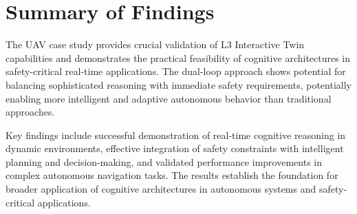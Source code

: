 \section{Summary of Findings}

The UAV case study provides crucial validation of L3 Interactive Twin capabilities and demonstrates the practical feasibility of cognitive architectures in safety-critical real-time applications. The dual-loop approach shows potential for balancing sophisticated reasoning with immediate safety requirements, potentially enabling more intelligent and adaptive autonomous behavior than traditional approaches.

Key findings include successful demonstration of real-time cognitive reasoning in dynamic environments, effective integration of safety constraints with intelligent planning and decision-making, and validated performance improvements in complex autonomous navigation tasks. The results establish the foundation for broader application of cognitive architectures in autonomous systems and safety-critical applications. 